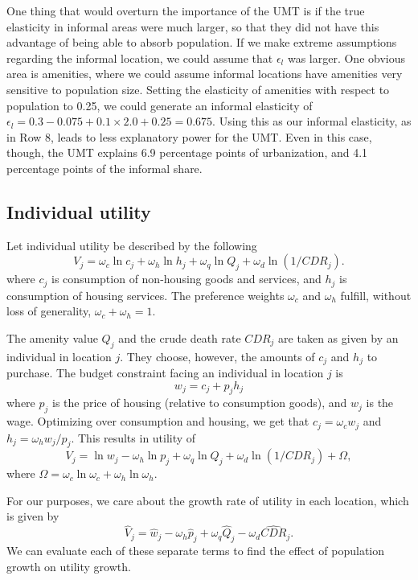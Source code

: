 \documentclass[10pt]{article}
\begin{document}
One thing that would overturn the importance of the UMT is if the true elasticity in informal areas were much larger, so that they did not have this advantage of being able to absorb population. If we make extreme assumptions regarding the informal location, we could assume that $\epsilon_l$ was larger. One obvious area is amenities, where we could assume informal locations have amenities very sensitive to population size. Setting the elasticity of amenities with respect to population to 0.25, we could generate an informal elasticity of $\epsilon_l = 0.3 - 0.075 + 0.1 \times 2.0 + 0.25 = 0.675$. Using this as our informal elasticity, as in Row 8, leads to less explanatory power for the UMT. Even in this case, though, the UMT explains 6.9 percentage points of urbanization, and 4.1 percentage points of the informal share. 
 
\subsection{Individual utility}
Let individual utility be described by the following
\begin{equation}
    V_j = \omega_c \ln c_j + \omega_h \ln h_j + \omega_q \ln Q_j + \omega_d \ln (1/CDR_j).
\end{equation}
where $c_j$ is consumption of non-housing goods and services, and $h_j$ is consumption of housing services. The preference weights $\omega_c$ and $\omega_h$ fulfill, without loss of generality, $\omega_c + \omega_h = 1$. 

The amenity value $Q_j$ and the crude death rate $CDR_j$ are taken as given by an individual in location $j$. They choose, however, the amounts of $c_j$ and $h_j$ to purchase.  The budget constraint facing an individual in location $j$ is
\begin{equation}
    w_j = c_j + p_j h_j
\end{equation}
where $p_j$ is the price of housing (relative to consumption goods), and $w_j$ is the wage. Optimizing over consumption and housing, we get that $c_j = \omega_c w_j$ and $h_j = \omega_h w_j/p_j$. This results in utility of
\begin{equation}
    V_j = \ln w_j - \omega_h \ln p_j + \omega_q \ln Q_j + \omega_d \ln (1/CDR_j) + \Omega,
\end{equation}
where $\Omega = \omega_c \ln \omega_c + \omega_h \ln \omega_h$. 

For our purposes, we care about the growth rate of utility in each location, which is given by
\begin{equation}
    \hat{V}_j = \hat{w}_j - \omega_h \hat{p}_j + \omega_q \hat{Q}_j - \omega_d \hat{CDR}_j.
\end{equation}
We can evaluate each of these separate terms to find the effect of population growth on utility growth.
\end{document}
